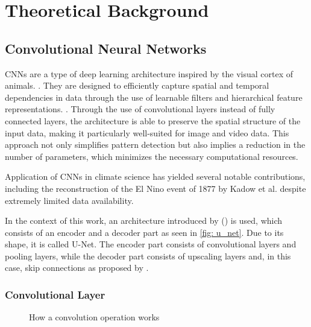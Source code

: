 \section{Theoretical Background}
\label{sec: theory}

\subsection{Convolutional Neural Networks}
\label{subsec: cnn}

CNNs are a type of deep learning architecture inspired by the visual cortex of animals. \cite{Yamashita2018CNN, hubel1968receptive}. They are designed to efficiently capture spatial and temporal dependencies in data through the use of learnable filters and hierarchical feature representations. \cite{Yamashita2018CNN}. Through the use of convolutional layers instead of fully connected layers, the architecture is able to preserve the spatial structure of the input data, making it particularly well-suited for image and video data. This approach not only simplifies pattern detection but also implies a reduction in the number of parameters, which minimizes the necessary computational resources.

Application of CNNs in climate science has yielded several notable contributions, including the reconstruction of the El Nino event of 1877 by Kadow et al. despite extremely limited data availability. \cite{kadow2020}

In the context of this work, an architecture introduced by (\cite{ronneberger2015}) is used, which consists of an encoder and a decoder part as seen in \autoref{fig: u_net}. Due to its shape, it is called U-Net. The encoder part consists of convolutional layers and pooling layers, while the decoder part consists of upscaling layers and, in this case, skip connections as proposed by \cite{liu2018inpaining}.

\subsubsection*{Convolutional Layer}
\begin{figure}[H]
    \centering
    \caption{How a convolution operation works}
    \label{fig: convolution_operation}
\end{figure}

